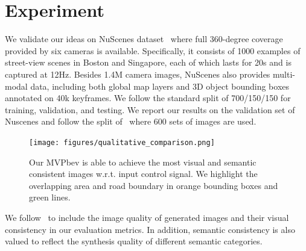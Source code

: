 \section{Experiment}
\label{sec:experiment}
 We validate our ideas on NuScenes dataset~\cite{caesar2020nuscenes} where full 360-degree coverage provided by six cameras is available. Specifically, it consists of 1000 examples of street-view scenes in Boston and Singapore, each of which lasts for 20s and is captured at 12Hz. Besides 1.4M camera images, NuScenes also provides multi-modal data, including both global map layers and 3D object bounding boxes annotated on 40k keyframes. 
We follow the standard split of 700/150/150 for training, validation, and testing. We report our results on the validation set of Nuscenes and follow the split of~\cite{caesar2020nuscenes} where 600 sets of images are used. 

\begin{table}[h!]
    \centering
    \caption{Quantitative results and human analysis on NuScenes. We observe a noticeable superiority of our MVPbev. %
    }
    \resizebox{\textwidth}{!}{
    
    }
    \label{tbl:qualitative}
\end{table}

\begin{figure}[t]
\centering
\texttt{[image: figures/qualitative\_comparison.png]}
\caption{Our MVPbev is able to achieve the most visual and semantic consistent images w.r.t. input control signal. We highlight the overlapping area and road boundary in orange bounding boxes and green lines. 
}
\label{fig:quali_comp}
\end{figure}

 We follow~\cite{Tang2023mvdiffusion} to include the image quality of generated images and their visual consistency in our evaluation metrics. In addition, semantic consistency is also valued to reflect the synthesis quality of different semantic categories.

